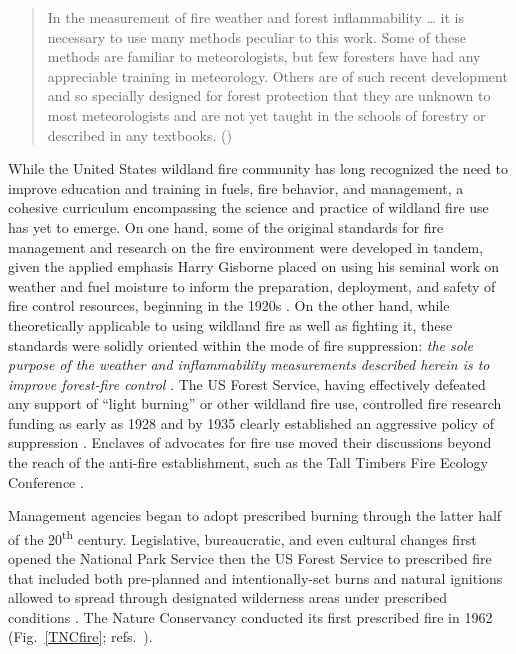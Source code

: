 \documentclass[fire,article,submit,moreauthors,pdftex]{Definitions/mdpi}
\begin{document}
\begin{quote}
In the measurement of fire weather and forest inflammability \ldots{} it is necessary to use many methods peculiar to this work.
Some of these methods are familiar to meteorologists, but few foresters have had any appreciable training in meteorology.
Others are of such recent development and so specially designed for forest protection that they are unknown to most meteorologists and are not yet taught in the schools of forestry or described in any textbooks. (\citet[][p.~1]{gisborne1936})
\end{quote}

While the United States wildland fire community has long recognized the need to improve education and training in fuels, fire behavior, and management, a cohesive curriculum encompassing the science and practice of wildland fire use has yet to emerge.
On one hand, some of the original standards for fire management and research on the fire environment were developed in tandem, given the applied emphasis Harry Gisborne placed on using his seminal work on weather and fuel moisture to inform the preparation, deployment, and safety of fire control resources, beginning in the 1920s \citep{hardy1983}.
On the other hand, while theoretically applicable to using wildland fire as well as fighting it, these standards were solidly oriented within the mode of fire suppression: \emph{the sole purpose of the weather and inflammability measurements described herein is to improve forest-fire control} \citep{gisborne1936}.
The US Forest Service, having effectively defeated any support of ``light burning'' or other wildland fire use, controlled fire research funding as early as 1928 and by 1935 clearly established an aggressive policy of suppression \citep{pyne2015}.
Enclaves of advocates for fire use moved their discussions beyond the reach of the anti-fire establishment, such as the Tall Timbers Fire Ecology Conference \citep{pyne2015}.

Management agencies began to adopt prescribed burning through the latter half of the 20\textsuperscript{th} century.
Legislative, bureaucratic, and even cultural changes first opened the National Park Service then the US Forest Service to prescribed fire that included both pre-planned and intentionally-set burns and natural ignitions allowed to spread through designated wilderness areas under prescribed conditions \citep{pyne2015}.
The Nature Conservancy conducted its first prescribed fire in 1962 (Fig.~\ref{TNCfire}; refs.~\citep{pyne2015, tnc2022}).
\end{document}
